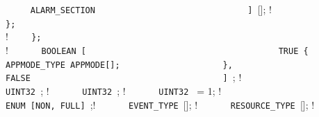 {{{{{{{\lstinline!	   ALARM_SECTION                        ! \newline
\lstinline!      ] ![];        ! \newline
\lstinline!                                             ! \newline
\lstinline!    };                                       ! \newline
\lstinline!                                             ! \newline
\lstinline!    ! {                   ! \newline
\lstinline!    };                                       ! \newline
\lstinline!                                             ! \newline
\lstinline!    ! {                      ! \newline
\lstinline!      BOOLEAN [                              ! \newline
\lstinline!        TRUE {                               ! \newline
\lstinline!          APPMODE_TYPE APPMODE[];            ! \newline
\lstinline!        },                                   ! \newline
\lstinline!        FALSE                                ! \newline
\lstinline!      ] !;              ! \newline
\lstinline!                                             ! \newline
\lstinline!      UINT32 !;          ! \newline
\lstinline!      UINT32 !;          ! \newline
\lstinline!      UINT32 ! = 1;    ! \newline
\lstinline!                                             ! \newline
\lstinline!      ENUM [NON, FULL] !;! \newline
\lstinline!      EVENT_TYPE ![];       ! \newline
\lstinline!      RESOURCE_TYPE ![]; ! \newline
\lstinline!                                             ! \newline
}}}}}}}}}
